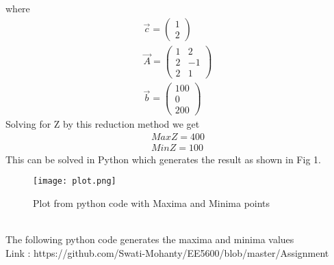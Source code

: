 \documentclass[journal,12pt,twocolumn]{IEEEtran}
\newcommand{\myvec}[1]{\ensuremath{\begin{pmatrix}#1\end{pmatrix}}}
\begin{document}
where
\begin{align}
    \Vec{c}=\myvec{1\\2}\\
    \Vec{A}=\myvec{1 & 2\\2 & -1\\2 & 1}\\
    \Vec{b}=\myvec{100\\0\\200}
\end{align}
Solving for Z by this reduction method we get
\begin{align}
    Max Z = 400 
    \\Min Z = 100
\end{align}
This can be solved in Python which generates the result as shown in Fig 1. 
\begin{figure}[h]
\renewcommand{\theenumi}{1}
\centering
\texttt{[image: plot.png]}
\caption{Plot from python code with Maxima and Minima points}
\label{Fig:1}
\end{figure}
\\The following python code generates the maxima and minima values
\\Link : https://github.com/Swati-Mohanty/EE5600/blob/master/Assignment%
\end{document}
